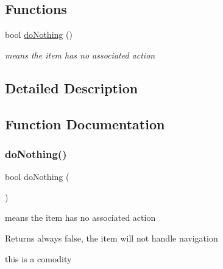 \subsection*{Functions}
\begin{DoxyCompactItemize}
\item 
bool \hyperlink{group__Agents_ga34d052b903454a7ceda33b9506513683}{do\+Nothing} ()
\begin{DoxyCompactList}\small\item\em means the item has no associated action \end{DoxyCompactList}\end{DoxyCompactItemize}


\subsection{Detailed Description}


\subsection{Function Documentation}
\mbox{\label{group__Agents_ga34d052b903454a7ceda33b9506513683}} 
\subsubsection{\texorpdfstring{do\+Nothing()}{doNothing()}}
{\footnotesize\ttfamily bool do\+Nothing (\begin{DoxyParamCaption}{ }\end{DoxyParamCaption})\hspace{0.3cm}{\ttfamily [inline]}}



means the item has no associated action 

\begin{DoxyReturn}{Returns}
always false, the item will not handle navigation
\end{DoxyReturn}
this is a comodity 